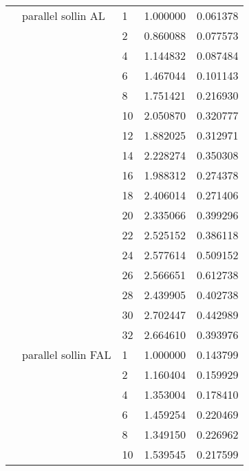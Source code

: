 \begin{tabular}{lllrr}
                      & parallel sollin AL & 1  &  1.000000 &  0.061378 \\
                      &                     & 2  &  0.860088 &  0.077573 \\
                      &                     & 4  &  1.144832 &  0.087484 \\
                      &                     & 6  &  1.467044 &  0.101143 \\
                      &                     & 8  &  1.751421 &  0.216930 \\
                      &                     & 10 &  2.050870 &  0.320777 \\
                      &                     & 12 &  1.882025 &  0.312971 \\
                      &                     & 14 &  2.228274 &  0.350308 \\
                      &                     & 16 &  1.988312 &  0.274378 \\
                      &                     & 18 &  2.406014 &  0.271406 \\
                      &                     & 20 &  2.335066 &  0.399296 \\
                      &                     & 22 &  2.525152 &  0.386118 \\
                      &                     & 24 &  2.577614 &  0.509152 \\
                      &                     & 26 &  2.566651 &  0.612738 \\
                      &                     & 28 &  2.439905 &  0.402738 \\
                      &                     & 30 &  2.702447 &  0.442989 \\
                      &                     & 32 &  2.664610 &  0.393976 \\
                      & parallel sollin FAL & 1  &  1.000000 &  0.143799 \\
                      &                     & 2  &  1.160404 &  0.159929 \\
                      &                     & 4  &  1.353004 &  0.178410 \\
                      &                     & 6  &  1.459254 &  0.220469 \\
                      &                     & 8  &  1.349150 &  0.226962 \\
                      &                     & 10 &  1.539545 &  0.217599 \\

\end{tabular}
